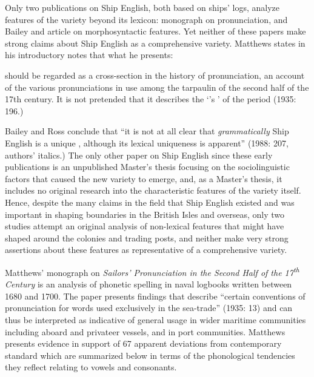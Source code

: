 Only two publications on Ship English, both based on ships’ logs, analyze features of the variety beyond its lexicon: \citet{Matthews1935} monograph on pronunciation, and Bailey and  article on morphosyntactic features. Yet neither of these papers make strong claims about Ship English as a comprehensive variety. Matthews states in his introductory notes that what he presents:

should be regarded as a cross-section in the history of pronunciation, an account of the various pronunciations in use among the tarpaulin  of the second half of the 17th century. It is not pretended that it describes the ‘’s ’ of the period (1935: 196.)

Bailey and Ross conclude that “it is not at all clear that \textit{grammatically} Ship English is a unique , although its lexical uniqueness is apparent” (1988: 207, authors’ italics.) The only other paper on Ship English since these early publications is an unpublished Master’s thesis \citep{Schultz2010} focusing on the sociolinguistic factors that caused the new variety to emerge, and, as a Master’s thesis, it includes no original research into the characteristic features of the variety itself. Hence, despite the many claims in the field that Ship English existed and was important in shaping  boundaries in the British Isles and overseas, only two studies attempt an original analysis of non-lexical features that might have shaped  around the colonies and trading posts, and neither make very strong assertions about these features as representative of a comprehensive variety.  

Matthews’ monograph on \textit{Sailors’ Pronunciation in the Second Half of the 17\textsuperscript{th} Century} is an analysis of phonetic spelling in naval logbooks written between 1680 and 1700. The paper presents findings that describe “certain conventions of pronunciation for words used exclusively in the sea-trade” (1935: 13) and can thus be interpreted as indicative of general usage in wider maritime communities including aboard  and privateer vessels, and in port communities. Matthews presents evidence in support of 67 apparent deviations from contemporary standard  which are summarized below in terms of the phonological tendencies they reflect relating to vowels and consonants. 

